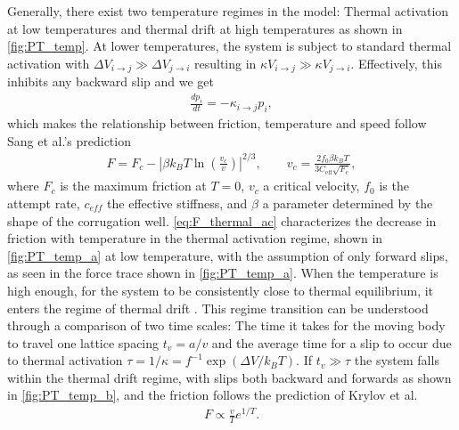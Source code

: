 Generally, there exist two temperature regimes in the model: Thermal activation at low temperatures and thermal drift at high temperatures as shown in \cref{fig:PT_temp}. At lower temperatures, the system is subject to standard thermal activation with $\Delta V_{i \to j} \gg \Delta V_{j \to i}$ resulting in  $\kappa V_{i \to j} \gg \kappa V_{j \to i}$. Effectively, this inhibits any backward slip and we get  
\begin{align*}
  \frac{dp_i}{dt} = -\kappa_{i\to j}p_i,
\end{align*}
which makes the relationship between friction, temperature and speed follow Sang et al.’s prediction \cite{Sang_2001}
\begin{align}
  F=F_c-\left|\beta k_B T \ln \left(\frac{v_c}{v}\right)\right|^{2 / 3}, \qquad v_c = \frac{2f_0\beta k_B T}{3 C_{\text{eff}} \sqrt{F_c}},
  \label{eq:F_thermal_ac}
\end{align}
where $F_c$ is the maximum friction at $T = 0$, $v_c$ a critical velocity, $f_0$
is the attempt rate, $c_{eff}$ the effective stiffness, and $\beta$ a
parameter determined by the shape of the corrugation well.
\cref{eq:F_thermal_ac} characterizes the decrease in friction with temperature
in the thermal activation regime, shown in \cref{fig:PT_temp_a} at low temperature, with the assumption of only forward slips, as seen in the force trace shown in \cref{fig:PT_temp_a}. When the temperature is high enough, for the system to be consistently close to thermal equilibrium, it enters the regime of thermal drift \cite{PhysRevE.71.065101}. This regime transition can be understood through a comparison of two time scales: The time it takes for the moving body to travel one lattice spacing
$t_v = a/v$ and the average time for a slip to occur due to thermal activation
$\tau = 1/\kappa = f^{-1}\exp(\Delta V / k_BT)$. If $t_v \gg \tau$ the system falls within the thermal drift regime, with slips both backward and forwards as shown in \cref{fig:PT_temp_b}, and the friction follows the prediction of Krylov et
al.\ \cite{Krylow_2007, PhysRevE.71.065101, Jinesh_2008}
\begin{align}
  F \propto \frac{v}{T}e^{1/T}.
  \label{eq:PT_thermal_drift}
\end{align}





  
